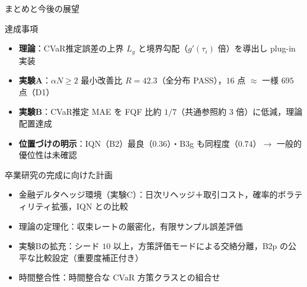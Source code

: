 \documentclass[aspectratio=169, 10pt]{beamer}
\newcommand{\blue}[1]{\textcolor{blue!80!black}{#1}}
\newcommand{\Lg}{L_g}
\begin{document}
\begin{frame}{まとめと今後の展望}
  \begin{exampleblock}{達成事項}
    \begin{itemize}
      \item \textbf{理論}：CVaR推定誤差の上界 $\Lg$ と境界勾配（$g'(\tau_i)$ 倍）を導出し plug-in 実装
      \item \textbf{実験A}：$\alpha N\ge 2$ 最小改善比 \alert{$R=42.3$}（全分布 PASS），$16$ 点 $\approx$ 一様 $695$ 点（D1）
      \item \textbf{実験B}：CVaR推定 MAE を FQF 比\alert{約 $1/7$}（共通参照約 $3$ 倍）に低減，理論配置達成
      \item \textbf{位置づけの明示}：IQN（B2）最良（$0.36$）・B3g も同程度（$0.74$）$\to$ 一般的優位性は未確認
    \end{itemize}
  \end{exampleblock}
  \vspace{-2pt}
  \begin{block}{卒業研究の完成に向けた計画}
    \begin{itemize}
      \item \blue{金融デルタヘッジ環境（実験C）}：日次リヘッジ＋取引コスト，確率的ボラティリティ拡張，IQN との比較
      \item \blue{理論の定理化}：収束レートの厳密化，有限サンプル誤差評価
      \item \blue{実験Bの拡充}：シード $10$ 以上，\blue{方策評価モード}による交絡分離，B2p の公平な比較設定（重要度補正付き）
      \item \blue{時間整合性}：時間整合な CVaR 方策クラスとの組合せ
    \end{itemize}
  \end{block}
\end{frame}

\end{document}
